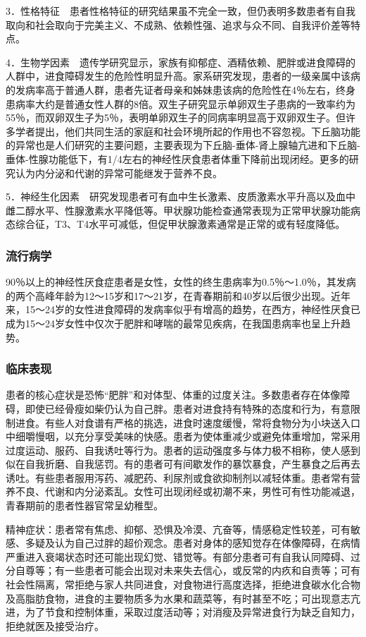 3．性格特征　患者性格特征的研究结果虽不完全一致，但仍表明多数患者有自我取向和社会取向于完美主义、不成熟、依赖性强、追求与众不同、自我评价差等特点。

4．生物学因素　遗传学研究显示，家族有抑郁症、酒精依赖、肥胖或进食障碍的人群中，进食障碍发生的危险性明显升高。家系研究发现，患者的一级亲属中该病的发病率高于普通人群，患者先证者母亲和姊妹患该病的危险性在4％左右，终身患病率大约是普通女性人群的8倍。双生子研究显示单卵双生子患病的一致率约为55％，而双卵双生子为5％，表明单卵双生子的同病率明显高于双卵双生子。但许多学者提出，他们共同生活的家庭和社会环境所起的作用也不容忽视。下丘脑功能的异常也是人们研究的主要问题，主要表现为下丘脑-垂体-肾上腺轴亢进和下丘脑-垂体-性腺功能低下，有1/4左右的神经性厌食患者体重下降前出现闭经。更多的研究认为内分泌和代谢的异常可能继发于营养不良。

5．神经生化因素　研究发现患者可有血中生长激素、皮质激素水平升高以及血中雌二醇水平、性腺激素水平降低等。甲状腺功能检查通常表现为正常甲状腺功能病态综合征，T3、T4水平可减低，但促甲状腺激素通常是正常的或有轻度降低。

\subsubsection{流行病学}

90％以上的神经性厌食症患者是女性，女性的终生患病率为0.5％～1.0％，其发病的两个高峰年龄为12～15岁和17～21岁，在青春期前和40岁以后很少出现。近年来，15～24岁的女性进食障碍的发病率似乎有增高的趋势，在西方，神经性厌食已成为15～24岁女性中仅次于肥胖和哮喘的最常见疾病，在我国患病率也呈上升趋势。

\subsubsection{临床表现}

患者的核心症状是恐怖“肥胖”和对体型、体重的过度关注。多数患者存在体像障碍，即使已经骨瘦如柴仍认为自己胖。患者对进食持有特殊的态度和行为，有意限制进食。有些人对食谱有严格的挑选，进食时速度缓慢，常将食物分为小块送入口中细嚼慢咽，以充分享受美味的快感。患者为使体重减少或避免体重增加，常采用过度运动、服药、自我诱吐等行为。患者的运动强度多与体力极不相称，使人感到似在自我折磨、自我惩罚。有的患者可有间歇发作的暴饮暴食，产生暴食之后再去诱吐。有些患者服用泻药、减肥药、利尿剂或食欲抑制剂以减轻体重。患者常有营养不良、代谢和内分泌紊乱。女性可出现闭经或初潮不来，男性可有性功能减退，青春期前的患者性器官常呈幼稚型。

精神症状：患者常有焦虑、抑郁、恐惧及冷漠、亢奋等，情感稳定性较差，可有敏感、多疑及认为自己过胖的超价观念。患者对身体的感知觉存在体像障碍，在病情严重进入衰竭状态时还可能出现幻觉、错觉等。有部分患者可有自我认同障碍、过分自尊等；有一些患者可能会出现对未来失去信心，或反常的内疚和自责等；可有社会性隔离，常拒绝与家人共同进食，对食物进行高度选择，拒绝进食碳水化合物及高脂肪食物，进食的主要物质多为水果和蔬菜等，有时甚至不吃；可出现意志亢进，为了节食和控制体重，采取过度活动等；对消瘦及异常进食行为缺乏自知力，拒绝就医及接受治疗。

